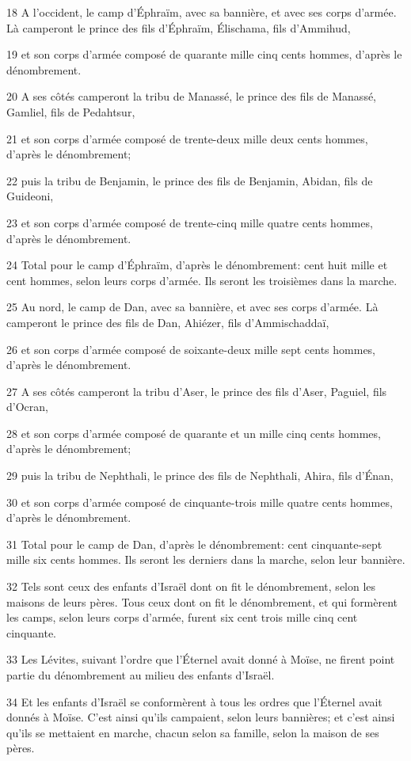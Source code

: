 \par 18 A l'occident, le camp d'Éphraïm, avec sa bannière, et avec ses corps d'armée. Là camperont le prince des fils d'Éphraïm, Élischama, fils d'Ammihud,
\par 19 et son corps d'armée composé de quarante mille cinq cents hommes, d'après le dénombrement.
\par 20 A ses côtés camperont la tribu de Manassé, le prince des fils de Manassé, Gamliel, fils de Pedahtsur,
\par 21 et son corps d'armée composé de trente-deux mille deux cents hommes, d'après le dénombrement;
\par 22 puis la tribu de Benjamin, le prince des fils de Benjamin, Abidan, fils de Guideoni,
\par 23 et son corps d'armée composé de trente-cinq mille quatre cents hommes, d'après le dénombrement.
\par 24 Total pour le camp d'Éphraïm, d'après le dénombrement: cent huit mille et cent hommes, selon leurs corps d'armée. Ils seront les troisièmes dans la marche.
\par 25 Au nord, le camp de Dan, avec sa bannière, et avec ses corps d'armée. Là camperont le prince des fils de Dan, Ahiézer, fils d'Ammischaddaï,
\par 26 et son corps d'armée composé de soixante-deux mille sept cents hommes, d'après le dénombrement.
\par 27 A ses côtés camperont la tribu d'Aser, le prince des fils d'Aser, Paguiel, fils d'Ocran,
\par 28 et son corps d'armée composé de quarante et un mille cinq cents hommes, d'après le dénombrement;
\par 29 puis la tribu de Nephthali, le prince des fils de Nephthali, Ahira, fils d'Énan,
\par 30 et son corps d'armée composé de cinquante-trois mille quatre cents hommes, d'après le dénombrement.
\par 31 Total pour le camp de Dan, d'après le dénombrement: cent cinquante-sept mille six cents hommes. Ils seront les derniers dans la marche, selon leur bannière.
\par 32 Tels sont ceux des enfants d'Israël dont on fit le dénombrement, selon les maisons de leurs pères. Tous ceux dont on fit le dénombrement, et qui formèrent les camps, selon leurs corps d'armée, furent six cent trois mille cinq cent cinquante.
\par 33 Les Lévites, suivant l'ordre que l'Éternel avait donné à Moïse, ne firent point partie du dénombrement au milieu des enfants d'Israël.
\par 34 Et les enfants d'Israël se conformèrent à tous les ordres que l'Éternel avait donnés à Moïse. C'est ainsi qu'ils campaient, selon leurs bannières; et c'est ainsi qu'ils se mettaient en marche, chacun selon sa famille, selon la maison de ses pères.

